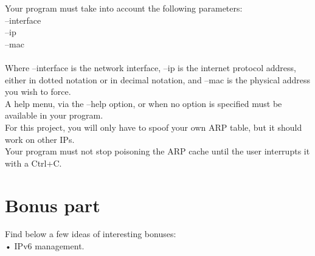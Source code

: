 \documentclass{42-en}
\begin{document}
    Your program must take into account the following parameters:\\
    --interface\\
    --ip\\
    --mac\\
    \\
    Where --interface is the network interface, --ip is the internet protocol address,
    either in dotted notation or in decimal notation, and --mac is the physical address you wish to force.\\

    A help menu, via the --help option, or when no option is specified must be available in your program.\\

    For this project, you will only have to spoof your own ARP table, but it should work on other IPs.\\
    Your program must not stop poisoning the ARP cache until the user interrupts it with a Ctrl+C.


\chapter{Bonus part}

 Find below a few ideas of interesting bonuses:\\
 
    • IPv6 management.


\end{document}
